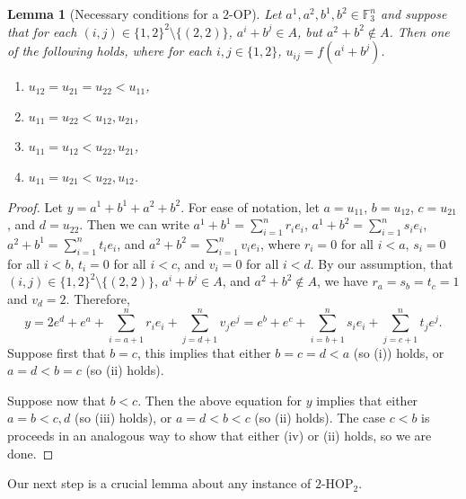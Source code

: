 \documentclass[12pt,oneside,british,a4wide]{amsart}
\newtheorem{lemma}[theorem]{Lemma}
\numberwithin{equation}{section}
\theoremstyle{definition}
\def\OP{\mathrm{OP}}
\def\HOP{\mathrm{HOP}}
\begin{document}
\begin{lemma}[Necessary conditions for a $2$-$\OP$]
Let $a^1,a^2,b^1,b^2\in \mathbb{F}_3^n$ and suppose that for each $(i,j)\in \{1,2\}^2\setminus \{(2,2)\}$, $a^i+b^j\in A$, but $a^2+b^2\notin A$.  Then one of the following holds, where for each $i,j\in \{1,2\}$, $u_{ij}=f(a^i+b^j)$.
\begin{enumerate}[label=\normalfont(\roman*)]
\item $u_{12}=u_{21}=u_{22}<u_{11}$,
\item $u_{11}=u_{22}<u_{12},u_{21}$,
\item $u_{11}=u_{12}<u_{22},u_{21}$,
\item $u_{11}=u_{21}<u_{22},u_{12}$.
\end{enumerate}
\end{lemma}
\begin{proof}
Let $y=a^1+b^1+a^2+b^2$.  For ease of notation, let $a=u_{11}$, $b=u_{12}$, $c=u_{21}$, and $d=u_{22}$.  Then we can write $a^1+b^1=\sum_{i=1}^nr_ie_i$, $a^1+b^2=\sum_{i=1}^ns_ie_i$, $a^2+b^1=\sum_{i=1}^nt_ie_i$, and $a^2+b^2=\sum_{i=1}^nv_ie_i$, where $r_i=0$ for all $i<a$, $s_i=0$ for all $i<b$, $t_i=0$ for all $i<c$, and $v_i=0$ for all $i<d$.  By our assumption, that $(i,j)\in \{1,2\}^2\setminus \{(2,2)\}$, $a^i+b^j\in A$, and $a^2+b^2\notin A$, we have $r_a=s_b=t_c=1$ and $v_d=2$.   Therefore,
$$
y=2e^d+e^a+\sum_{i=a+1}^nr_ie_i+\sum_{j=d+1}^nv_je^j=e^b+e^c+\sum_{i=b+1}^ns_ie_i+\sum_{j=c+1}^nt_je^j.
$$
Suppose first that $b=c$, this implies that either $b=c=d<a$ (so (i)) holds, or $a=d<b=c$ (so (ii) holds).

Suppose now that $b<c$.  Then the above equation for $y$ implies that either $a=b<c,d$ (so (iii) holds), or $a=d<b<c$ (so (ii) holds).  The case $c<b$ is proceeds in an analogous way to show that either (iv) or (ii) holds, so we are done.
\end{proof}

Our next step is a crucial lemma about any instance of $2$-$\HOP_2$. 
\end{document}
